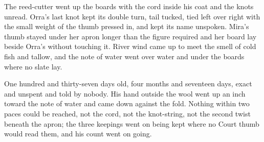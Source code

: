 The reed-cutter went up the boards with the cord inside his coat and the knots unread. Orra's last knot kept its double turn, tail tucked, tied left over right with the small weight of the thumb pressed in, and kept its name unspoken. Mira's thumb stayed under her apron longer than the figure required and her board lay beside Orra's without touching it. River wind came up to meet the smell of cold fish and tallow, and the note of water went over water and under the boards where no slate lay.

One hundred and thirty-seven days old, four months and seventeen days, exact and unspent and told by nobody. His hand outside the wool went up an inch toward the note of water and came down against the fold. Nothing within two paces could be reached, not the cord, not the knot-string, not the second twist beneath the apron; the three keepings went on being kept where no Court thumb would read them, and his count went on going.
